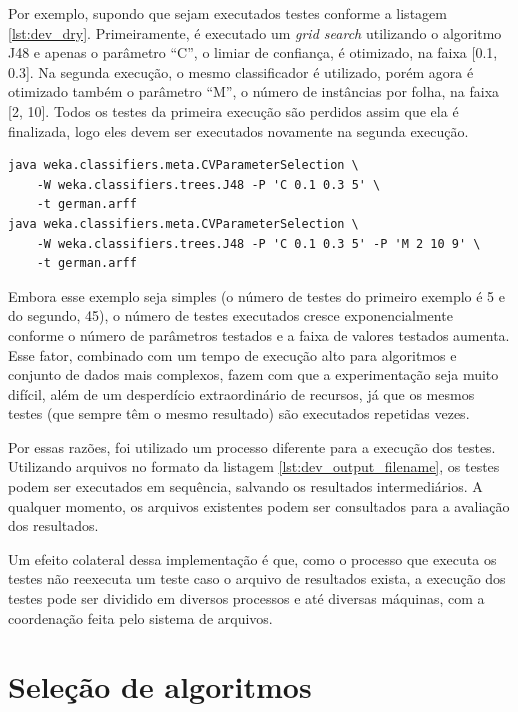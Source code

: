 Por exemplo, supondo que sejam executados testes conforme a listagem \ref{lst:dev_dry}. Primeiramente, é executado um \emph{grid search} utilizando o algoritmo J48 e apenas o parâmetro ``C'', o limiar de confiança, é otimizado, na faixa [0.1, 0.3]. Na segunda execução, o mesmo classificador é utilizado, porém agora é otimizado também o parâmetro ``M'', o número de instâncias por folha, na faixa [2, 10]. Todos os testes da primeira execução são perdidos assim que ela é finalizada, logo eles devem ser executados novamente na segunda execução.

\vspace{0.5cm}
\begin{lstlisting}[caption=Desperdício de recursos em execuções subsequentes, label=lst:dev_dry]
java weka.classifiers.meta.CVParameterSelection \
    -W weka.classifiers.trees.J48 -P 'C 0.1 0.3 5' \
    -t german.arff
java weka.classifiers.meta.CVParameterSelection \
    -W weka.classifiers.trees.J48 -P 'C 0.1 0.3 5' -P 'M 2 10 9' \
    -t german.arff
\end{lstlisting}
\vspace{0.5cm}

Embora esse exemplo seja simples (o número de testes do primeiro exemplo é 5 e do segundo, 45), o número de testes executados cresce exponencialmente conforme o número de parâmetros testados e a faixa de valores testados aumenta. Esse fator, combinado com um tempo de execução alto para algoritmos e conjunto de dados mais complexos, fazem com que a experimentação seja muito difícil, além de um desperdício extraordinário de recursos, já que os mesmos testes (que sempre têm o mesmo resultado) são executados repetidas vezes.

Por essas razões, foi utilizado um processo diferente para a execução dos testes. Utilizando arquivos no formato da listagem \ref{lst:dev_output_filename}, os testes podem ser executados em sequência, salvando os resultados intermediários. A qualquer momento, os arquivos existentes podem ser consultados para a avaliação dos resultados.

Um efeito colateral dessa implementação é que, como o processo que executa os testes não reexecuta um teste caso o arquivo de resultados exista, a execução dos testes pode ser dividido em diversos processos e até diversas máquinas, com a coordenação feita pelo sistema de arquivos.

\section{Seleção de algoritmos}

